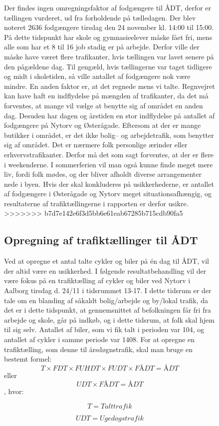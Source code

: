 \begin{figure}[htbp]
Der findes ingen omregningsfaktor af fodgængere til ÅDT, derfor er tællingen vurderet, ud fra forholdende på tælledagen. Der blev noteret 2636 fodgængere tirsdag den 24 november kl. 14:00 til 15:00. På dette tidspunkt har skole og gymnasieelever måske fået fri, mens alle som har et 8 til 16 job stadig er på arbejde. Derfor ville der måske have været flere trafikanter, hvis tællingen var lavet senere på den pågældene dag. Til gengæld, hvis tællingerne var taget tidligere og midt i skoletiden, så ville antallet af fodgængere nok være mindre. En anden faktor er, at det regnede mens vi talte. Regnvejret kan have haft en indflydelse på mængden af trafikanter, da det må forventes, at mange vil vælge at benytte sig af området en anden dag. Desuden har dagen og årstiden en stor indflydelse på antallet af fodgængere på Nytorv og Østerågade. Eftersom at der er mange butikker i området, er det ikke bolig– og arbejdetrafik, som benytter sig af området. Det er nærmere folk personlige ærinder eller erhvervstrafikanter. Derfor må det som sagt forventes, at der er flere i weekenderne. I sommerferien vil man også kunne finde meget mere liv, fordi folk mødes, og der bliver afholdt diverse arrangementer nede i byen. Hvis der skal konkluderes på usikkerhederne, er antallet af fodgængere i Østerågade og Nytorv meget situationsafhængig, og resultaterne af trafiktællingerne i rapporten er derfor usikre.
>>>>>>> b7d7e142e6f3d5bb6e61eab67285b715cdb90fa5
\subsection{Opregning af trafiktællinger til ÅDT}
\label{sub:opregning}
Ved at opregne et antal talte cykler og biler på én dag til ÅDT, vil der altid være en usikkerhed.
I følgende resultatbehandling vil der være fokus på en trafiktælling af cykler og biler ved Nytorv i Aalborg tirsdag d. 24/11 i tidsrummet 13-17. I dette tidsrum er der tale om en blanding af såkaldt bolig/arbejde og by/lokal trafik, da det er i dette tidspunkt, at gennemsnittet af befolkningen får fri fra arbejde og skole, går på indkøb, og i dette tidsrum, at folk skal hjem til sig selv.
Antallet af biler, som vi fik talt i perioden var 104, og antallet af cykler i samme periode var 1408.
For at opregne en trafiktælling, som denne til årsdøgnstrafik, skal man bruge en bestemt formel:
$$ T \times FDT \times FUHDT \times FUDT \times FÅDT = ÅDT $$ eller $$ UDT \times FÅDT = ÅDT$$ , hvor:

$$T = Talt trafik$$

$$UDT = Ugedøgstrafik$$


\end{figure}
